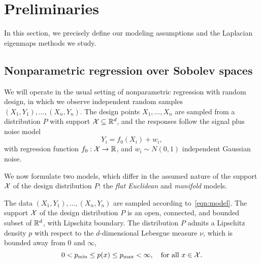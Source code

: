 \section{Preliminaries}
\label{sec:setup_main_results}

In this section, we precisely define our modeling assumptions and the Laplacian eigenmaps methods we study.

\subsection{Nonparametric regression over Sobolev spaces}
\label{sec:regression_laplacian_eigenmaps}

We will operate in the usual setting of nonparametric regression with random design, in which we observe independent random samples $(X_1,Y_1),\ldots,(X_n,Y_n)$. The design points $X_1,\ldots,X_n$ are sampled from a distribution $P$ with support $\mathcal{X} \subseteq \mathbb{R}^d$, and the responses follow the signal plus noise model
\begin{equation}
\label{eqn:model}
Y_i = f_0(X_i) + w_i,
\end{equation}
with regression function $f_0: \mathcal{X} \to \mathbb{R}$, and $w_i \sim N(0,1)$ independent Gaussian noise. 

We now formulate two models, which differ in the assumed nature of the support $\mathcal{X}$ of the design distribution $P$: the \emph{flat Euclidean} and \emph{manifold} models.

\begin{definition}
	\label{def:model_flat_euclidean}
	The data $(X_1,Y_1),\ldots,(X_n,Y_n)$ are sampled according to~\eqref{eqn:model}. The support $\mathcal{X}$ of the design distribution $P$ is an open, connected, and bounded subset of $\mathbb{R}^d$, with Lipschitz boundary. The distribution $P$ admits a Lipschitz density $p$ with respect to the $d$-dimensional Lebesgue measure $\nu$, which is bounded away from $0$ and $\infty$,
	\begin{equation*}
	0 < p_{\min} \leq p(x) \leq p_{\max} < \infty, \quad \textrm{for all $x \in \mathcal{X}$.}
	\end{equation*}
\end{definition}

